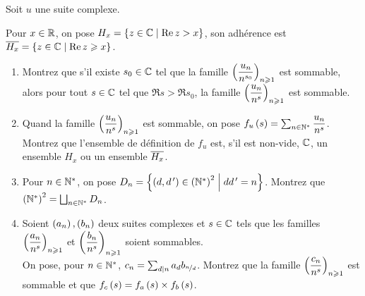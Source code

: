 \begin{exoss}[Exercice 29]
Soit \(u\) une suite complexe.

Pour \(x\in\mathbb{R}\), on pose \(H_x=\left\lbrace z\in\mathbb{C}\;\middle|\;\operatorname{Re} z>x\right\rbrace\), son adhérence est \(\overline{H_x}=\left\lbrace z\in\mathbb{C}\;\middle|\;\operatorname{Re} z\geqslant x\right\rbrace\).

\begin{enumerate}
    \item Montrez que s'il existe \(s_0\in\mathbb{C}\) tel que la famille \(\left(\dfrac{u_n}{n^{s_0}}\right)_{n\geqslant1}\) est sommable, alors pour tout \(s\in\mathbb{C}\) tel que \(\Re s>\Re s_0\), la famille \(\left(\dfrac{u_n}{n^s}\right)_{n\geqslant1}\) est sommable. \\
    \item Quand la famille \(\left(\dfrac{u_n}{n^s}\right)_{n\geqslant1}\) est sommable, on pose \(f_u\left(s\right)=\sum_{n\in\mathbb{N}^*}\dfrac{u_n}{n^s}\). \\ Montrez que l'ensemble de définition de \(f_u\) est, s'il est non-vide, \(\mathbb{C}\), un ensemble \(H_x\) ou un ensemble \(\overline{H_x}\). \\
    \item Pour \(n\in\mathbb{N}^*\), on pose \(D_n=\left\lbrace\left(d,d^{\,\prime}\right)\in\left(\mathbb{N}^*\right)^2\;\middle|\; dd^{\,\prime}=n\right\rbrace\). Montrez que \(\left(\mathbb{N}^*\right)^2=\bigsqcup_{n\in\mathbb{N}^*}D_n\). \\
    \item Soient \(\left(a_n\right),\left(b_n\right)\) deux suites complexes et \(s\in\mathbb{C}\) tels que les familles \(\left(\dfrac{a_n}{n^s}\right)_{n\geqslant1}\) et \(\left(\dfrac{b_n}{n^s}\right)_{n\geqslant1}\) soient sommables. \\ On pose, pour \(n\in\mathbb{N}^*\), \(c_n=\sum_{d\mid n}a_db_{\nicefrac{n}{d}}\). Montrez que la famille \(\left(\dfrac{c_n}{n^s}\right)_{n\geqslant1}\) est sommable et que \(f_c\left(s\right)=f_a\left(s\right)\times f_b\left(s\right)\).
\end{enumerate}
\end{exoss}



